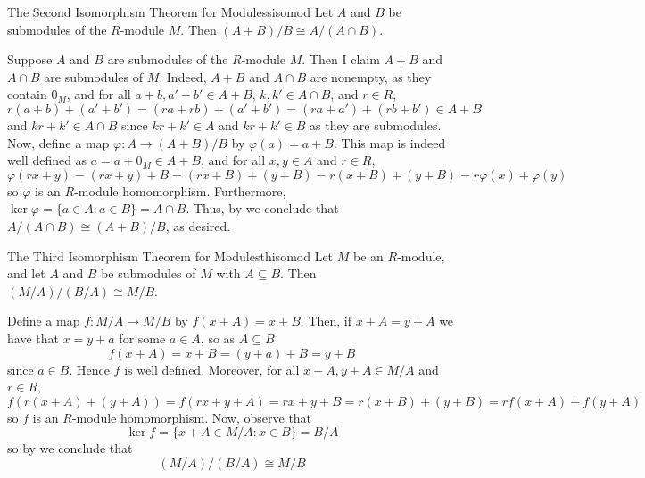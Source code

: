 \documentclass[12pt, a4paper, twoside, openright, titlepage]{book}
\begin{document}
\begin{namthm}{The Second Isomorphism Theorem for Modules}{sisomod}
    Let $A$ and $B$ be submodules of the $R$-module $M$. Then $(A+B)/B\cong A/(A\cap B)$. 
\end{namthm}
\begin{proof*}{}{}
    Suppose $A$ and $B$ are submodules of the $R$-module $M$. Then I claim $A+B$ and $A\cap B$ are submodules of $M$. Indeed, $A+B$ and $A\cap B$ are nonempty, as they contain $0_M$, and for all $a+b,a'+b' \in A+B$, $k,k' \in A\cap B$, and $r \in R$, \begin{equation*}
        r(a+b)+(a'+b') = (ra+rb)+(a'+b') = (ra+a')+(rb+b') \in A+B
    \end{equation*}
    and $kr+k' \in A\cap B$ since $kr+k' \in A$ and $kr+k' \in B$ as they are submodules. Now, define a map $\varphi:A\rightarrow (A+B)/B$ by $\varphi(a) = a+B$. This map is indeed well defined as $a = a+0_M \in A+B$, and for all $x,y \in A$ and $r \in R$, \begin{equation*}
        \varphi(rx+y) = (rx+y)+B = (rx+B)+(y+B) = r(x+B)+(y+B) = r\varphi(x)+\varphi(y)
    \end{equation*}
    so $\varphi$ is an $R$-module homomorphism. Furthermore, $\ker\varphi = \{a\in A: a \in B\} = A\cap B$. Thus, by  we conclude that $A/(A\cap B) \cong (A+B)/B$, as desired.
\end{proof*}


\begin{namthm}{The Third Isomorphism Theorem for Modules}{thisomod}
    Let $M$ be an $R$-module, and let $A$ and $B$ be submodules of $M$ with $A \subseteq B$. Then $(M/A)/(B/A) \cong M/B$. 
\end{namthm}
\begin{proof*}{}{}
    Define a map $f:M/A\rightarrow M/B$ by $f(x+A) = x+B$. Then, if $x+A = y+A$ we have that $x=y+a$ for some $a \in A$, so as $A \subseteq B$ $$f(x+A) = x+B = (y+a) + B = y+B$$
    since $a \in B$. Hence $f$ is well defined. Moreover, for all $x+A,y+A \in M/A$ and $r \in R$, \begin{equation*}
        f(r(x+A)+(y+A)) = f(rx+y+A) = rx+y+B = r(x+B)+(y+B) = rf(x+A) + f(y+A)
    \end{equation*}
    so $f$ is an $R$-module homomorphism. Now, observe that $$\ker f = \{x+A \in M/A: x \in B\} = B/A$$
    so by  we conclude that \begin{equation*}
        (M/A)/(B/A) \cong M/B
    \end{equation*}
\end{proof*}
\end{document}
